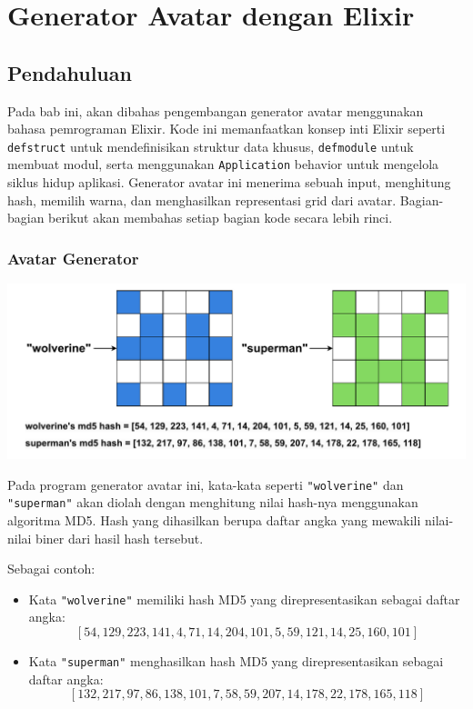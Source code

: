 \chapter{Generator Avatar dengan Elixir}

\section{Pendahuluan}
Pada bab ini, akan dibahas pengembangan generator avatar menggunakan bahasa pemrograman Elixir. Kode ini memanfaatkan konsep inti Elixir seperti \texttt{defstruct} untuk mendefinisikan struktur data khusus, \texttt{defmodule} untuk membuat modul, serta menggunakan \texttt{Application} behavior untuk mengelola siklus hidup aplikasi. Generator avatar ini menerima sebuah input, menghitung hash, memilih warna, dan menghasilkan representasi grid dari avatar. Bagian-bagian berikut akan membahas setiap bagian kode secara lebih rinci.

\subsection{Avatar Generator}
	\begin{center}
		\includegraphics[width=1\textwidth]{../assets/avatar-example.pdf}
	\end{center}

Pada program generator avatar ini, kata-kata seperti \texttt{"wolverine"} dan \texttt{"superman"} akan diolah dengan menghitung nilai hash-nya menggunakan algoritma MD5. Hash yang dihasilkan berupa daftar angka yang mewakili nilai-nilai biner dari hasil hash tersebut.

Sebagai contoh:
\begin{itemize}
	\item Kata \texttt{"wolverine"} memiliki hash MD5 yang direpresentasikan sebagai daftar angka: 
	\[
	[54, 129, 223, 141, 4, 71, 14, 204, 101, 5, 59, 121, 14, 25, 160, 101]
	\]
	\item Kata \texttt{"superman"} menghasilkan hash MD5 yang direpresentasikan sebagai daftar angka:
	\[
	[132, 217, 97, 86, 138, 101, 7, 58, 59, 207, 14, 178, 22, 178, 165, 118]
	\]
\end{itemize}

